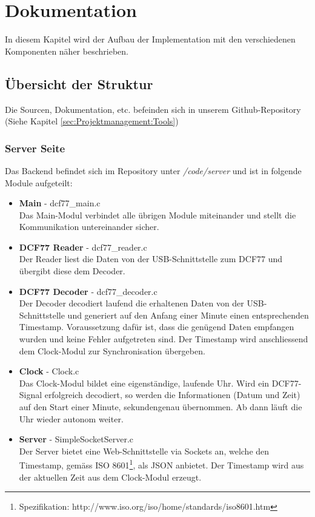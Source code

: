 
\chapter{Dokumentation}
In diesem Kapitel wird der Aufbau der Implementation mit den verschiedenen Komponenten näher beschrieben.

\section{Übersicht der Struktur}
Die Sourcen, Dokumentation, etc. befeinden sich in unserem Github-Repository (Siehe Kapitel \ref{sec:Projektmanagement:Tools})
\subsection{Server Seite}
Das Backend befindet sich im Repository unter \textit{/code/server} und ist in folgende Module aufgeteilt:

\begin{itemize}
\item {\textbf{Main} - dcf77\_main.c} \\
Das Main-Modul verbindet alle übrigen Module miteinander und stellt die Kommunikation untereinander sicher.

\item {\textbf{DCF77 Reader} - dcf77\_reader.c} \\
Der Reader liest die Daten von der USB-Schnittstelle zum DCF77 und übergibt diese dem Decoder.

\item {\textbf{DCF77 Decoder} - dcf77\_decoder.c}\\
Der Decoder decodiert laufend die erhaltenen Daten von der USB-Schnittstelle und generiert auf den Anfang einer Minute einen entsprechenden Timestamp. Voraussetzung dafür ist, dass die genügend Daten empfangen wurden und keine Fehler aufgetreten sind. Der Timestamp wird anschliessend dem Clock-Modul zur Synchronisation übergeben.

\item {\textbf{Clock} - Clock.c}\\
Das Clock-Modul bildet eine eigenständige, laufende Uhr. Wird ein DCF77-Signal erfolgreich decodiert, so werden die Informationen (Datum und Zeit) auf den Start einer Minute, sekundengenau übernommen. Ab dann läuft die Uhr wieder autonom weiter.

\item {\textbf{Server} - SimpleSocketServer.c}\\
Der Server bietet eine Web-Schnittstelle via Sockets an, welche den Timestamp, gemäss ISO 8601\footnote{Spezifikation: http://www.iso.org/iso/home/standards/iso8601.htm}, als JSON anbietet. Der Timestamp wird aus der aktuellen Zeit aus dem Clock-Modul erzeugt.

\end{itemize} 

